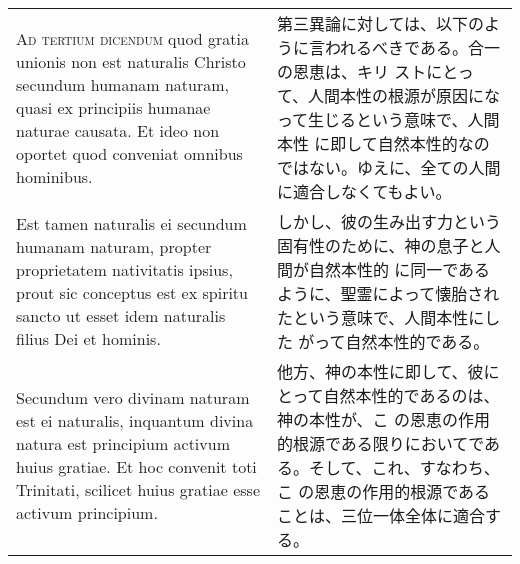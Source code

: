 \documentclass[10pt]{jsarticle} %
\begin{document}
\begin{longtable}{p{21em}p{21em}}
\\



{\scshape Ad tertium dicendum} quod gratia unionis non est naturalis
Christo secundum humanam naturam, quasi ex principiis humanae naturae
causata. Et ideo non oportet quod conveniat omnibus hominibus.


&

第三異論に対しては、以下のように言われるべきである。合一の恩恵は、キリ
ストにとって、人間本性の根源が原因になって生じるという意味で、人間本性
に即して自然本性的なのではない。ゆえに、全ての人間に適合しなくてもよい。

\\

Est tamen naturalis ei secundum humanam naturam, propter proprietatem
nativitatis ipsius, prout sic conceptus est ex spiritu sancto ut esset
idem naturalis filius Dei et hominis.



&

しかし、彼の生み出す力という固有性のために、神の息子と人間が自然本性的
に同一であるように、聖霊によって懐胎されたという意味で、人間本性にした
がって自然本性的である。


\\

Secundum vero divinam naturam est ei naturalis, inquantum divina
natura est principium activum huius gratiae. Et hoc convenit toti
Trinitati, scilicet huius gratiae esse activum principium.


&

他方、神の本性に即して、彼にとって自然本性的であるのは、神の本性が、こ
の恩恵の作用的根源である限りにおいてである。そして、これ、すなわち、こ
の恩恵の作用的根源であることは、三位一体全体に適合する。


\end{longtable}
\end{document}
